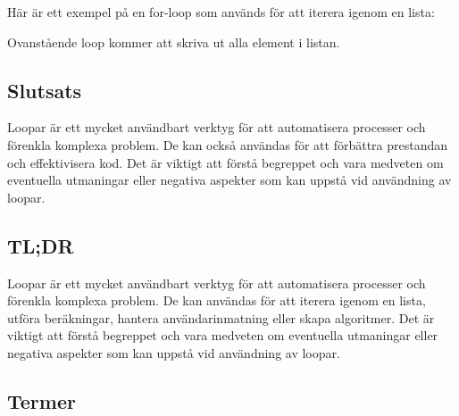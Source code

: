 Här är ett exempel på en for-loop som används för att iterera igenom en
lista:

\hypertarget{cb1}{}
\begin{Shaded}
\begin{Highlighting}[]
\OperatorTok{[]}\OperatorTok{=} \OperatorTok{\{}\OperatorTok{,} \OperatorTok{,} \OperatorTok{,} \OperatorTok{,} \OperatorTok{\};}
 \OperatorTok{(}\OperatorTok{=} \OperatorTok{;}\OperatorTok{\textless{}}\OperatorTok{;}\OperatorTok{++)} \OperatorTok{\{}
    \OperatorTok{(}\OperatorTok{[}\OperatorTok{]);}
\OperatorTok{\}}
\end{Highlighting}
\end{Shaded}

Ovanstående loop kommer att skriva ut alla element i listan.

\hypertarget{slutsats}{%
\subsection{Slutsats}\label{slutsats}}

Loopar är ett mycket användbart verktyg för att automatisera processer
och förenkla komplexa problem. De kan också användas för att förbättra
prestandan och effektivisera kod. Det är viktigt att förstå begreppet
och vara medveten om eventuella utmaningar eller negativa aspekter som
kan uppstå vid användning av loopar.

\hypertarget{tldr}{%
\subsection{TL;DR}\label{tldr}}

Loopar är ett mycket användbart verktyg för att automatisera processer
och förenkla komplexa problem. De kan användas för att iterera igenom en
lista, utföra beräkningar, hantera användarinmatning eller skapa
algoritmer. Det är viktigt att förstå begreppet och vara medveten om
eventuella utmaningar eller negativa aspekter som kan uppstå vid
användning av loopar.

\hypertarget{termer}{%
\subsection{Termer}\label{termer}}

